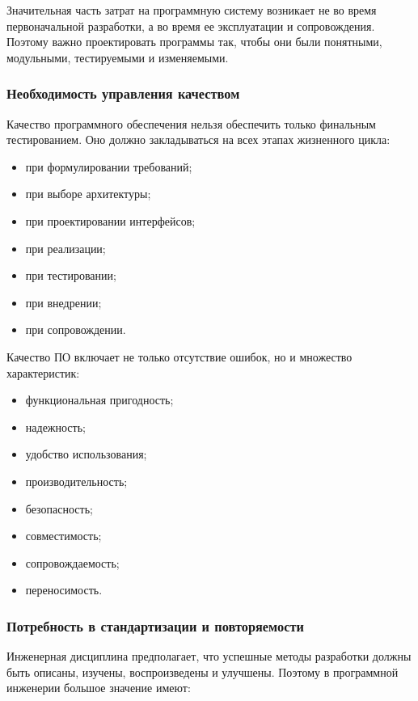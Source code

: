 \documentclass[12pt,a4paper]{article}
\begin{document}
Значительная часть затрат на программную систему возникает не во время первоначальной разработки, а во время ее эксплуатации и сопровождения. Поэтому важно проектировать программы так, чтобы они были понятными, модульными, тестируемыми и изменяемыми.

\subsubsection{Необходимость управления качеством}

Качество программного обеспечения нельзя обеспечить только финальным тестированием. Оно должно закладываться на всех этапах жизненного цикла:

\begin{itemize}
    \item при формулировании требований;
    \item при выборе архитектуры;
    \item при проектировании интерфейсов;
    \item при реализации;
    \item при тестировании;
    \item при внедрении;
    \item при сопровождении.
\end{itemize}

Качество ПО включает не только отсутствие ошибок, но и множество характеристик:

\begin{itemize}
    \item функциональная пригодность;
    \item надежность;
    \item удобство использования;
    \item производительность;
    \item безопасность;
    \item совместимость;
    \item сопровождаемость;
    \item переносимость.
\end{itemize}

\subsubsection{Потребность в стандартизации и повторяемости}

Инженерная дисциплина предполагает, что успешные методы разработки должны быть описаны, изучены, воспроизведены и улучшены. Поэтому в программной инженерии большое значение имеют:
\end{document}
